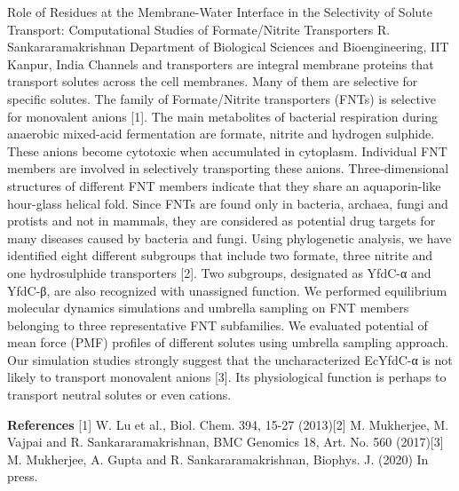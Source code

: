 
    \begin{abstract_online}{Role of Residues at the Membrane-Water Interface in the Selectivity of Solute Transport: Computational Studies of Formate/Nitrite Transporters}{%
        R. Sankararamakrishnan}{%
        \IStag}{%
        Department of Biological Sciences and Bioengineering, IIT Kanpur, India}
    Channels and transporters are integral membrane proteins that transport solutes across the cell membranes. Many of them are selective for specific solutes. The family of Formate/Nitrite transporters (FNTs) is selective for monovalent anions [1]. The main metabolites of bacterial respiration during anaerobic mixed-acid fermentation are formate, nitrite and hydrogen sulphide. These anions become cytotoxic when accumulated in cytoplasm. Individual FNT members are involved in selectively transporting these anions. Three-dimensional structures of different FNT members indicate that they share an aquaporin-like hour-glass helical fold. Since FNTs are found only in bacteria, archaea, fungi and protists and not in mammals, they are considered as potential drug targets for many diseases caused by bacteria and fungi. Using phylogenetic analysis, we have identified eight different subgroups that include two formate, three nitrite and one hydrosulphide transporters [2]. Two subgroups, designated as YfdC-α and YfdC-β, are also recognized with unassigned function. We performed equilibrium molecular dynamics simulations and umbrella sampling on FNT members belonging to three representative FNT subfamilies. We evaluated potential of mean force (PMF) profiles of different solutes using umbrella sampling approach. Our simulation studies strongly suggest that the uncharacterized EcYfdC-α is not likely to transport monovalent anions [3]. Its physiological function is perhaps to transport neutral solutes or even cations.  
    
        \textbf{References} \newline{}[1] W. Lu et al., Biol. Chem. 394, 15-27 (2013)\newline{}[2] M. Mukherjee, M. Vajpai and R. Sankararamakrishnan, BMC Genomics 18, Art. No. 560 (2017)\newline{}[3] M. Mukherjee, A. Gupta and R. Sankararamakrishnan, Biophys. J. (2020) In press.
    \end{abstract_online}
    